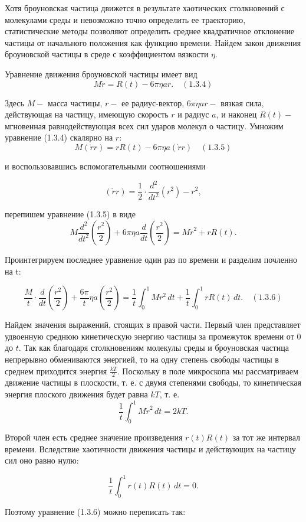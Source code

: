 Хотя броуновская частица движется в результате хаотических столкновений с молекулами среды и невозможно точно определить ее траекторию, статистические методы позволяют определить среднее квадратичное отклонение частицы от начального положения как функцию времени. Найдем закон движения броуновской частицы в среде с коэффициентом вязкости $\eta$.

Уравнение движения броуновской частицы имеет вид
$$M\ddot{r} = R(t) - 6 \pi \eta ar. \quad (1.3.4)$$

Здесь $M -$ масса частицы, $r -$ ее радиус-вектор, $6\pi \eta ar -$ вязкая сила, действующая на частицу, имеющую скорость $r$ и радиус $a$, и наконец $R(t) -$ мгновенная равнодействующая всех сил ударов молекул о частицу. Умножим уравнение (1.3.4) скалярно на $r$:
$$M(\ddot{r}r)= rR(t)- 6\pi \eta a(\dot{r} r) \quad (1.3.5) $$

и воспользовавшись вспомогательными соотношениями

$$(\dot{r}r)=\frac{1}{2} \cdot \frac{d^2}{dt^2}(r^2)- r^2, $$

перепишем уравнение (1.3.5) в виде
$$ M \frac{d^2}{dt^2}\left(\frac{r^2}{2}\right) + 6 \pi \eta a \frac{d}{dt}\left( \frac{r^2}{2}\right) = M\dot{r}^2 + rR(t).$$

Проинтегрируем последнее уравнение один раз по времени и разделим почленно на t:

$$\frac{M}{t} \cdot \frac{d}{dt}\left(\frac{r^2}{2}\right) + \frac{6 \pi }{t} \eta a\left( \frac{r^2}{2}\right)=\frac{1}{t} \int_{0}^{1}Mr^2\,dt + \frac{1}{t}\int_{0}^{1}rR(t)\,dt. \quad (1.3.6)$$

Найдем значения выражений, стоящих в правой части. Первый член представляет удвоенную среднюю кинетическую энергию частицы за промежуток времени от $0$ до $t$. Так как благодаря столкновениям молекулы среды и броуновская частица непрерывно обмениваются энергией, то на одну степень свободы частицы в среднем приходится энергия $\frac{kT}{2}$. Поскольку в поле микроскопа мы рассматриваем движение частицы в плоскости, т. е. с двумя степенями свободы, то кинетическая энергия плоского движения будет равна $kT$, т. е.
$$\frac{1}{t} \int_{0}^{1} M\dot{r}^2 \, dt = 2kT.$$

Второй член есть среднее значение произведения $r(t)R(t)$ за тот же интервал времени. Вследствие хаотичности движения частицы и действующих на частицу сил оно равно нулю:

$$ \frac{1}{t}\int_{0}^{1}r(t)R(t) \, dt = 0.$$

Поэтому уравнение (1.3.6) можно переписать так:

